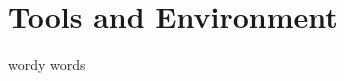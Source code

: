 \documentclass[main.tex]{subfiles}
\begin{document}
\chapter{Tools and Environment}

wordy words
\end{document}
